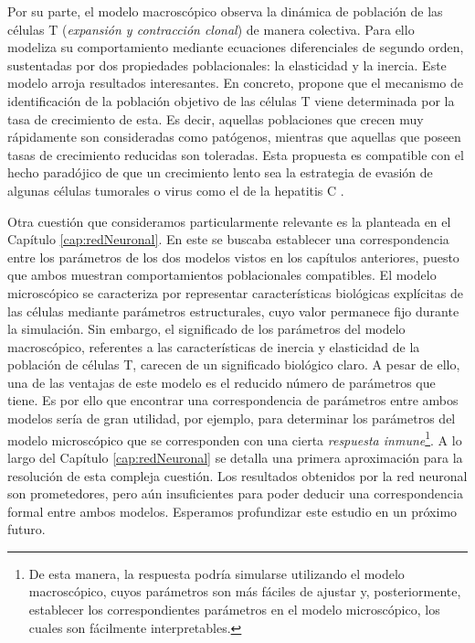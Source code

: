Por su parte, el modelo macroscópico observa la dinámica de población de las células T (\textit{expansión y contracción clonal}) de manera colectiva. Para ello modeliza su comportamiento mediante ecuaciones diferenciales de segundo orden, sustentadas por dos propiedades poblacionales: la elasticidad y la inercia. Este modelo arroja resultados interesantes. En concreto, propone que el mecanismo de identificación de la población objetivo de las células T viene determinada por la tasa de crecimiento de esta. Es decir, aquellas poblaciones que crecen muy rápidamente son consideradas como patógenos, mientras que aquellas que poseen tasas de crecimiento reducidas son toleradas. Esta propuesta es compatible con el hecho paradójico de que un crecimiento lento sea la estrategia de evasión de algunas células tumorales o virus como el de la hepatitis C \citep{Crawford39.17, pmid23596300}. 

Otra cuestión que consideramos particularmente relevante es la planteada en el Capítulo \ref{cap:redNeuronal}. En este se buscaba establecer una correspondencia entre los parámetros de los dos modelos vistos en los capítulos anteriores, puesto que ambos muestran comportamientos poblacionales compatibles. El modelo microscópico se caracteriza por representar características biológicas explícitas de las células mediante parámetros estructurales, cuyo valor permanece fijo durante la simulación. Sin embargo, el significado de los parámetros del modelo macroscópico, referentes a las características de inercia y elasticidad de la población de células T, carecen de un significado biológico claro. A pesar de ello, una de las ventajas de este modelo es el reducido número de parámetros que tiene. Es por ello que encontrar una correspondencia de parámetros entre ambos modelos sería de gran utilidad, por ejemplo, para determinar los parámetros del modelo microscópico que se corresponden con una cierta \textit{respuesta inmune}\footnote{De esta manera, la respuesta podría simularse utilizando el modelo macroscópico, cuyos parámetros son más fáciles de ajustar y, posteriormente, establecer los correspondientes parámetros en el modelo microscópico, los cuales son fácilmente interpretables.}. A lo largo del Capítulo \ref{cap:redNeuronal} se detalla una primera aproximación para la resolución de esta compleja cuestión. Los resultados obtenidos por la red neuronal son prometedores, pero aún insuficientes para poder deducir una correspondencia formal entre ambos modelos. Esperamos profundizar este estudio en un próximo futuro.

